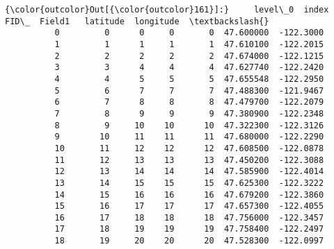 \documentclass[11pt]{article}
\begin{document}
\begin{Verbatim}[commandchars=\\\{\}]
{\color{outcolor}Out[{\color{outcolor}161}]:}     level\_0  index  FID\_  Field1   latitude  longitude  \textbackslash{}
          0         0      0     0       0  47.600000  -122.3000   
          1         1      1     1       1  47.610100  -122.2015   
          2         2      2     2       2  47.674000  -122.1215   
          3         3      4     4       4  47.627740  -122.2420   
          4         4      5     5       5  47.655548  -122.2950   
          5         6      7     7       7  47.488300  -121.9467   
          6         7      8     8       8  47.479700  -122.2079   
          7         8      9     9       9  47.380900  -122.2348   
          8         9     10    10      10  47.322300  -122.3126   
          9        10     11    11      11  47.680000  -122.2290   
          10       11     12    12      12  47.608500  -122.0878   
          11       12     13    13      13  47.450200  -122.3088   
          12       13     14    14      14  47.585900  -122.4014   
          13       14     15    15      15  47.625300  -122.3222   
          14       15     16    16      16  47.679200  -122.3860   
          15       16     17    17      17  47.657300  -122.4055   
          16       17     18    18      18  47.756000  -122.3457   
          17       18     19    19      19  47.758400  -122.2497   
          18       19     20    20      20  47.528300  -122.0997   
          

\end{Verbatim}
\end{document}
